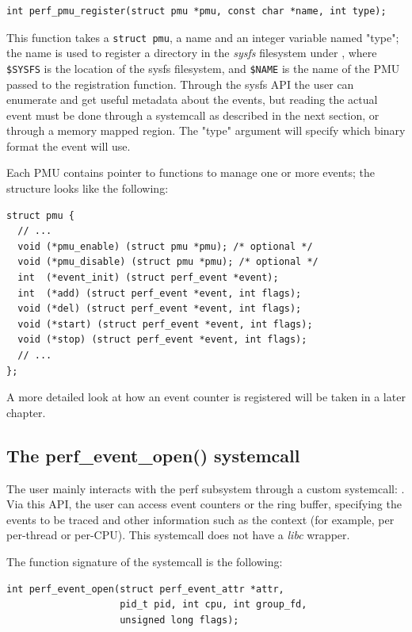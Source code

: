 \begin{verbatim}
int perf_pmu_register(struct pmu *pmu, const char *name, int type);
\end{verbatim}

This function takes a \verb|struct pmu|, a name and an integer variable named
"type"; the name is used to register a directory in the \textit{sysfs}
filesystem under , where
\verb|$SYSFS| is the location of the sysfs filesystem, and \verb|$NAME| is the
name of the PMU passed to the registration function. Through the sysfs API the
user can enumerate and get useful metadata about the events, but reading the
actual event must be done through a systemcall as described in the next section,
or through a memory mapped region. The "type" argument will specify which binary
format the event will use.

Each PMU contains pointer to functions to manage one or more events; the
structure looks like the following:

\begin{verbatim}
struct pmu {
  // ...
  void (*pmu_enable) (struct pmu *pmu); /* optional */
  void (*pmu_disable) (struct pmu *pmu); /* optional */
  int  (*event_init) (struct perf_event *event);
  int  (*add) (struct perf_event *event, int flags);
  void (*del) (struct perf_event *event, int flags);
  void (*start) (struct perf_event *event, int flags);
  void (*stop) (struct perf_event *event, int flags);
  // ...
};
\end{verbatim}

A more detailed look at how an event counter is registered will be taken in a
later chapter.

\subsection{The perf\_event\_open() systemcall}

The user mainly interacts with the perf subsystem through a custom systemcall:
. Via this API, the user can access event counters or
the ring buffer, specifying the events to be traced and other information such
as the context (for example, per per-thread or per-CPU). This systemcall does
not have a \textit{libc} wrapper.

The function signature of the systemcall is the following:

\begin{verbatim}
int perf_event_open(struct perf_event_attr *attr,
                    pid_t pid, int cpu, int group_fd,
                    unsigned long flags);
\end{verbatim}

